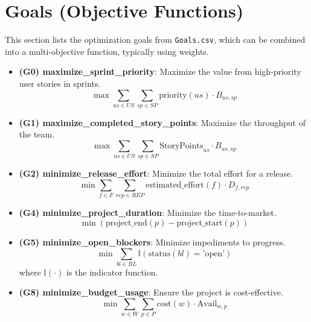 \documentclass[11pt]{article}
\begin{document}
\section{Goals (Objective Functions)}
This section lists the optimization goals from \texttt{Goals.csv}, which can be combined into a multi-objective function, typically using weights.
\begin{itemize}
    \item \textbf{(G0) maximize\_sprint\_priority}: Maximize the value from high-priority user stories in sprints.
    $$ \max \sum_{us \in US} \sum_{sp \in SP} \text{priority}(us) \cdot B_{us,sp} $$
    \item \textbf{(G1) maximize\_completed\_story\_points}: Maximize the throughput of the team.
    $$ \max \sum_{us \in US} \sum_{sp \in SP} \text{StoryPoints}_{us} \cdot B_{us,sp} $$
    \item \textbf{(G2) minimize\_release\_effort}: Minimize the total effort for a release.
    $$ \min \sum_{f \in F} \sum_{rep \in REP} \text{estimated\_effort}(f) \cdot D_{f,rep} $$
    \item \textbf{(G4) minimize\_project\_duration}: Minimize the time-to-market.
    $$ \min (\text{project\_end}(p) - \text{project\_start}(p)) $$
    \item \textbf{(G5) minimize\_open\_blockers}: Minimize impediments to progress.
    $$ \min \sum_{bl \in BL} \mathbb{I}(\text{status}(bl) = \text{'open'}) $$
    where $\mathbb{I}(\cdot)$ is the indicator function.
    \item \textbf{(G8) minimize\_budget\_usage}: Ensure the project is cost-effective.
    $$ \min \sum_{w \in W} \sum_{p \in P} \text{cost}(w) \cdot \text{Avail}_{w,p} $$
\end{itemize}
\end{document}
